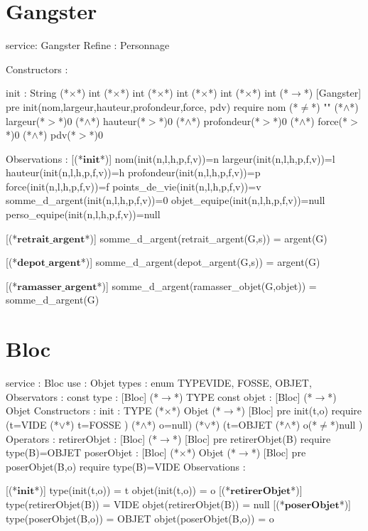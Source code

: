 \documentclass[a4paper, 11pt, notitlepage]{report}
\newcommand{\specB}[1]{\textbf{#1}}
\begin{document}
\section{Gangster}
\begin{Spe}
service: Gangster
Refine : Personnage

Constructors : 

	init : String (*$\times$*) int (*$\times$*) int (*$\times$*) int (*$\times$*) int (*$\times$*) int  (*$\rightarrow$*) [Gangster]
		pre init(nom,largeur,hauteur,profondeur,force, pdv) require nom (*$\neq$*) "" (*$\land$*) largeur(*$>$*)0 (*$\land$*) hauteur(*$>$*)0 (*$\land$*) profondeur(*$>$*)0 (*$\land$*) force(*$>$*)0 (*$\land$*) pdv(*$>$*)0 
		
Observations :
	[(*$\specB{init}$*)]
		nom(init(n,l,h,p,f,v))=n
		largeur(init(n,l,h,p,f,v))=l
		hauteur(init(n,l,h,p,f,v))=h
		profondeur(init(n,l,h,p,f,v))=p
		force(init(n,l,h,p,f,v))=f
		points_de_vie(init(n,l,h,p,f,v))=v
		somme_d_argent(init(n,l,h,p,f,v))=0
		objet_equipe(init(n,l,h,p,f,v))=null
		perso_equipe(init(n,l,h,p,f,v))=null
		
	[(*$\specB{retrait\_argent}$*)]
		somme_d_argent(retrait_argent(G,s)) = argent(G)
		
	[(*$\specB{depot\_argent}$*)]
		somme_d_argent(depot_argent(G,s)) = argent(G) 

	[(*$\specB{ramasser\_argent}$*)]
		somme_d_argent(ramasser_objet(G,objet)) = somme_d_argent(G)
					
\end{Spe}

\section{Bloc}
\begin{Spe}
service : Bloc
use : Objet
types : enum TYPE{VIDE, FOSSE, OBJET},
Observators :
      const type : [Bloc] (*$\rightarrow$*) TYPE
      const objet : [Bloc] (*$\rightarrow$*) Objet
Constructors :
      init : TYPE (*$\times$*) Objet (*$\rightarrow$*) [Bloc]
	    pre init(t,o) require 
	    (t=VIDE (*$\lor$*) t=FOSSE ) (*$\land$*) o=null) (*$\lor$*) (t=OBJET (*$\land$*) o(*$\ne$*)null ) 
Operators :
      retirerObjet : [Bloc] (*$\rightarrow$*) [Bloc]
	    pre retirerObjet(B) require type(B)=OBJET
      poserObjet : [Bloc] (*$\times$*) Objet (*$\rightarrow$*) [Bloc]
	    pre poserObjet(B,o) require type(B)=VIDE 
Observations :
     
      [(*$\specB{init}$*)]
	    type(init(t,o)) = t
	    objet(init(t,o)) = o
      [(*$\specB{retirerObjet}$*)]
	    type(retirerObjet(B)) = VIDE
	    objet(retirerObjet(B)) = null
      [(*$\specB{poserObjet}$*)] 
	    type(poserObjet(B,o)) = OBJET
	    objet(poserObjet(B,o)) = o 
     
\end{Spe}
 
\end{document}
